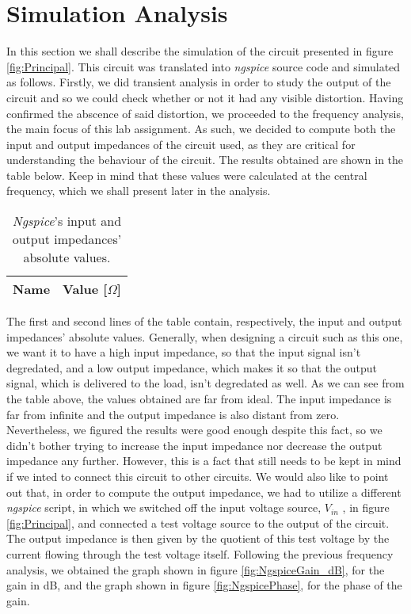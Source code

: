 \clearpage

\section{Simulation Analysis}
\label{sec:simulation}
\vspace{-0.5cm}
In this section we shall describe the simulation of the circuit presented in figure \ref{fig:Principal}. This circuit was translated into \emph{ngspice}
source code and simulated as follows.
Firstly, we did transient analysis in order to study the output of the circuit and so we could check whether or
not it had any visible distortion. Having confirmed the abscence of said distortion, we proceeded to the frequency analysis,
the main focus of this lab assignment.
As such, we decided to compute both the input and output impedances of the circuit used, as they are critical for
understanding the behaviour of the circuit. The results obtained are shown in the table below. Keep in mind that these values were calculated
at the central frequency, which we shall present later in the analysis.

\vspace{-0.65cm}
\begin{table}[h]\label{tab:SimZ}
    \centering
    \begin{tabular}{|c|c|}
      \hline
      {\bf Name} & {\bf Value [$\Omega$]} \\ \hline
      
    \end{tabular}
    \vspace{-2.5mm}
    \caption{\emph{Ngspice}'s input and output impedances' absolute values.}
\end{table}

\vspace{-0.45cm}
The first and second lines of the table contain, respectively, the input and output impedances' absolute values.
Generally, when designing a circuit such as this one, we want it to have a high input impedance,
so that the input signal isn’t degredated, and a low output impedance, which makes it so that the
output signal, which is delivered to the load, isn’t degredated as well. As we
can see from the table above, the values obtained are far from ideal. The input impedance is far from infinite and the output impedance is also
distant from zero. Nevertheless, we figured the results were good enough despite this fact, so we didn't bother trying to increase the input
impedance nor decrease the output impedance any further. However, this is a fact that still needs to be kept in mind if we inted to connect this circuit
to other circuits. We would also like to point out that, in order to compute the output impedance, we had to utilize a different \emph{ngspice} 
script, in which we switched off the input voltage source, $V_{in}$ , in figure \ref{fig:Principal}, and connected a test voltage source to
the output of the circuit. The output impedance is then given by the quotient
of this test voltage by the current flowing through the test voltage itself.
Following the previous frequency analysis, we obtained the graph shown in figure \ref{fig:NgspiceGain_dB}, for the
gain in dB, and the graph shown in figure \ref{fig:NgspicePhase}, for the phase of the gain.

